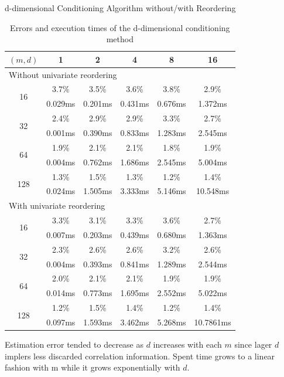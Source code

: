 \begin{frame}{d-dimensional Conditioning Algorithm without/with Reordering}
\tiny

\begin{table}[h]
	\centering
	{
		\begin{tabular}{@{}cccccc@{}}
			\toprule
			$(m, d)$ & 1 & 2 & 4 & 8 & 16 \\ \midrule
			\multicolumn{6}{l}{Without univariate reordering} \\ \midrule
			\multirow{2}{*}{16} & 3.7\% & 3.5\% & 3.6\% & 3.8\% & 2.9\% \\
			& 0.029ms & 0.201ms & 0.431ms & 0.676ms & 1.372ms \\
			\multirow{2}{*}{32} & 2.4\% & 2.9\% & 2.9\% & 3.3\% & 2.7\% \\
			& 0.001ms & 0.390ms & 0.833ms & 1.283ms & 2.545ms \\
			\multirow{2}{*}{64} & 1.9\% & 2.1\% & 2.1\% & 1.8\% & 1.9\% \\
			& 0.004ms & 0.762ms & 1.686ms & 2.545ms & 5.004ms \\
			\multirow{2}{*}{128} & 1.3\% & 1.5\% & 1.3\% & 1.2\% & 1.4\% \\
			& 0.024ms & 1.505ms & 3.333ms & 5.146ms & 10.548ms \\ \midrule
			\multicolumn{6}{l}{With univariate reordering} \\ \midrule
			\multirow{2}{*}{16} & 3.3\% & 3.1\% & 3.3\% & 3.6\% & 2.7\% \\
			& 0.007ms & 0.203ms & 0.439ms & 0.680ms & 1.363ms \\
			\multirow{2}{*}{32} & 2.3\% & 2.6\% & 2.6\% & 3.2\% & 2.6\% \\
			& 0.004ms & 0.393ms & 0.841ms & 1.289ms & 2.544ms \\
			\multirow{2}{*}{64} & 2.0\% & 2.1\% & 2.1\% & 1.9\% & 1.9\% \\
			& 0.014ms & 0.773ms & 1.695ms & 2.552ms & 5.022ms \\
			\multirow{2}{*}{128} & 1.2\% & 1.5\% & 1.4\% & 1.2\% & 1.4\% \\
			& 0.097ms & 1.593ms & 3.462ms & 5.268ms & 10.7861ms \\ \bottomrule
		\end{tabular}%
	}
	\caption{Errors and execution times of the d-dimensional conditioning method}
	\label{tab:table2}
\end{table}
\footnotesize
Estimation error tended to decrease as $d$ increases with each $m$ since lager $d$ implers less discarded correlation information. Spent time grows to a linear fashion with m while it grows exponentially with $d$.
\end{frame}

